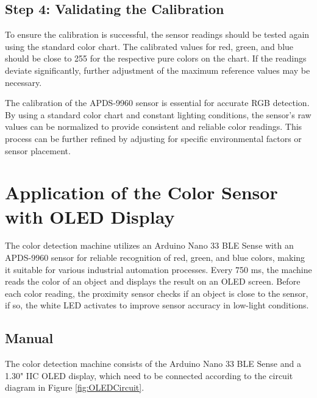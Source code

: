 \subsection{Step 4: Validating the Calibration}
To ensure the calibration is successful, the sensor readings should be tested again using the standard color chart. The calibrated values for red, green, and blue should be close to 255 for the respective pure colors on the chart. If the readings deviate significantly, further adjustment of the maximum reference values may be necessary.

\medskip
The calibration of the APDS-9960 sensor is essential for accurate RGB detection. By using a standard color chart and constant lighting conditions, the sensor’s raw values can be normalized to provide consistent and reliable color readings. This process can be further refined by adjusting for specific environmental factors or sensor placement.

\section{Application of the Color Sensor with OLED Display}

The color detection machine utilizes an Arduino Nano 33 BLE Sense with an APDS-9960 sensor for reliable recognition of red, green, and blue colors, making it suitable for various industrial automation processes. Every 750 ms, the machine reads the color of an object and displays the result on an OLED screen. Before each color reading, the proximity sensor checks if an object is close to the sensor, if so, the white LED activates to improve sensor accuracy in low-light conditions.

\subsection{Manual}
The color detection machine consists of the Arduino Nano 33 BLE Sense and a 1.30" IIC OLED display, which need to be connected according to the circuit diagram in Figure \ref{fig:OLEDCircuit}.

